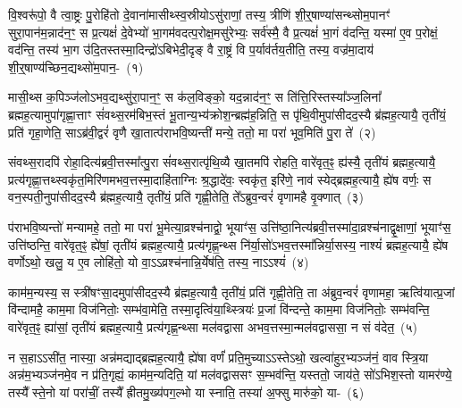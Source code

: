 \setcounter{anuvakam}{0}
वि॒श्वरू॑पो॒ वै त्वा॒ष्ट्रः पु॒रोहि॑तो दे॒वाना॑मासीथ्स्व॒स्रीयो\-ऽसु॑राणां॒ तस्य॒ त्रीणि॑ शी॒र्॒\mbox{}षाण्या॑सन्थ्सोम॒पानꣳ॑ सुरा॒पान॑म॒न्नाद॑न॒ꣳ॒ स प्र॒त्यक्षं॑ दे॒वेभ्यो॑ भा॒गम॑वदत्प॒रोक्ष॒मसु॑रेभ्यः॒ सर्व॑स्मै॒ वै प्र॒त्यक्षं॑ भा॒गं व॑दन्ति॒ यस्मा॑ ए॒व प॒रोक्षं॒ वद॑न्ति॒ तस्य॑ भा॒ग उ॑दि॒तस्तस्मा॒दिन्द्रो॑\-ऽबिभेदी॒दृङ् वै रा॒ष्ट्रं वि प॒र्याव॑र्तय॒तीति॒ तस्य॒ वज्र॑मा॒दाय॑ शी॒र्॒\mbox{}षाण्य॑च्छिन॒द्यथ्सो॑म॒पान॒-~(१)

मासी॒थ्स क॒पिञ्ज॑लो\-ऽभव॒द्यथ्सु॑रा॒पान॒ꣳ॒ स क॑ल॒विङ्को॒ यद॒न्नाद॑न॒ꣳ॒ स ति॑त्ति॒रिस्तस्या᳚ञ्ज॒लिना᳚ ब्रह्मह॒त्यामुपा॑गृह्णा॒त्ताꣳ सं॑वथ्स॒रम॑बिभ॒स्तं भू॒तान्य॒भ्य॑क्रोश॒न्ब्रह्म॑ह॒न्निति॒ स पृ॑थि॒वीमुपा॑सीद\-द॒स्यै ब्र॑ह्मह॒त्यायै॒ तृती॑यं॒ प्रति॑ गृहा॒णेति॒ साऽब्र॑वी॒द्वरं॑ वृणै खा॒तात्प॑रा\-भवि॒ष्यन्ती॑ मन्ये॒ ततो॒ मा परा॑ भूव॒मिति॑ पु॒रा ते॑~(२)

संवथ्स॒रादपि॑ रोहा॒दित्य॑ब्रवी॒त्तस्मा᳚त्पु॒रा सं॑वथ्स॒रात्पृ॑थि॒व्यै खा॒तमपि॑ रोहति॒ वारे॑वृत॒ꣴ॒ ह्य॑स्यै॒ तृती॑यं ब्रह्मह॒त्यायै॒ प्रत्य॑गृह्णा॒त्तथ्स्वकृ॑त॒मिरि॑णमभव॒त्तस्मा॒दाहि॑ताग्निः श्र॒द्धादे॑वः॒ स्वकृ॑त॒ इरि॑णे॒ नाव॑ स्येद्ब्रह्मह॒त्यायै॒ ह्ये॑ष वर्णः॒ स वन॒स्पती॒नुपा॑सीदद॒स्यै ब्र॑ह्मह॒त्यायै॒ तृती॑यं॒ प्रति॑ गृह्णी॒तेति॒ ते᳚\-ऽब्रुव॒न्वरं॑ वृणामहै वृ॒क्णात्~(३)

प॑राभवि॒ष्यन्तो॑ मन्यामहे॒ ततो॒ मा परा॑ भू॒मेत्या॒व्रश्च॑नाद्वो॒ भूयाꣳ॑स॒ उत्ति॑ष्ठा॒नित्य॑ब्रवी॒त्तस्मा॑दा॒व्रश्च॑नाद्वृ॒क्षाणां॒ भूयाꣳ॑स॒ उत्ति॑ष्ठन्ति॒ वारे॑वृत॒ꣴ॒ ह्ये॑षां॒ तृती॑यं ब्रह्मह॒त्यायै॒ प्रत्य॑गृह्ण॒न्थ्स नि॑र्या॒सो॑\-ऽभव॒त्तस्मा᳚न्निर्या॒सस्य॒ नाश्यं॑ ब्रह्मह॒त्यायै॒ ह्ये॑ष वर्णो\-ऽथो॒ खलु॒ य ए॒व लोहि॑तो॒ यो वा॒\-ऽ\-ऽव्रश्च॑नान्नि॒र्येष॑ति॒ तस्य॒ नाऽऽश्यं॑~(४)

काम॑म॒न्यस्य॒ स स्त्री॑षꣳसा॒दमुपा॑सीदद॒स्यै ब्र॑ह्मह॒त्यायै॒ तृती॑यं॒ प्रति॑ गृह्णी॒तेति॒ ता अ॑ब्रुव॒न्वरं॑ वृणामहा॒ ऋत्वि॑यात्प्र॒जां वि॑न्दामहै॒ काम॒मा विज॑नितोः॒ सम्भ॑वा॒मेति॒ तस्मा॒दृत्वि॑या॒थ्स्त्रियः॑ प्र॒जां वि॑न्दन्ते॒ काम॒मा विज॑नितोः॒ सम्भ॑वन्ति॒ वारे॑वृत॒ꣴ॒ ह्या॑सां॒ तृती॑यं ब्रह्मह॒त्यायै॒ प्रत्य॑गृह्ण॒न्थ्सा मल॑वद्वासा अभव॒त्तस्मा॒न्मल॑वद्वाससा॒ न सं व॑देत॒~(५)

न स॒हाऽऽसी॑त॒ नास्या॒ अन्न॑मद्याद्ब्रह्मह॒त्यायै॒ ह्ये॑षा वर्णं॑ प्रति॒मुच्याऽऽस्ते\-ऽथो॒ खल्वा॑हुर॒भ्यञ्ज॑नं॒ वाव स्त्रि॒या अन्न॑म॒भ्यञ्ज॑नमे॒व न प्र॑ति॒गृह्यं॒ काम॑म॒न्यदिति॒ यां मल॑वद्वाससꣳ स॒म्भव॑न्ति॒ यस्ततो॒ जाय॑ते॒ सो॑\-ऽभिश॒स्तो यामर॑ण्ये॒ तस्यै᳚ स्ते॒नो यां परा॑चीं॒ तस्यै᳚ ह्रीतमु॒ख्य॑पग॒ल्भो या स्नाति॒ तस्या॑ अ॒फ्सु मारु॑को॒ या-~(६)

